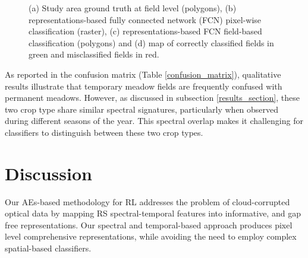 \documentclass[journal,article,submit,pdftex,moreauthors]{Definitions/mdpi}
\begin{document}
\begin{figure}[H]
	\caption{(a) Study area ground truth at field level (polygons), (b) representations-based fully connected network (FCN) pixel-wise classification (raster), (c) representations-based FCN field-based classification (polygons) and (d) map of correctly classified fields in green and misclassified fields in red.}
	\label{fig:maps}
\end{figure}

As reported in the confusion matrix (Table \ref{confusion_matrix}), qualitative results illustrate that temporary meadow fields are frequently confused with permanent meadows. However, as discussed in subsection \ref{results_section}, these two crop type share similar spectral signatures, particularly when observed during different seasons of the year. This spectral overlap makes it challenging for classifiers to distinguish between these two crop types. 



\section{Discussion}
Our AEs-based methodology for RL addresses the problem of cloud-corrupted optical data by mapping RS spectral-temporal features into informative, and gap free representations.
Our spectral and temporal-based approach produces pixel level comprehensive representations, while avoiding the need to employ complex spatial-based classifiers.
\end{document}
